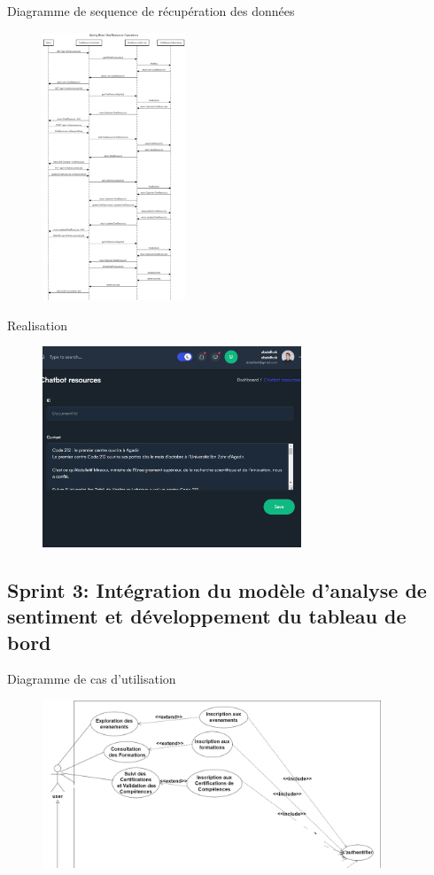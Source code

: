 \begin{frame}{Diagramme de sequence de récupération des données}
    \begin{figure}[H]
        \centering
        \includegraphics[height=8cm]{assets/images/chat-res-seq.png}
    \end{figure}
\end{frame}

\begin{frame}{Realisation}
    \begin{figure}[H]
        \centering
        \includegraphics[height=6cm]{assets/images/admin-doc.png}
    \end{figure}
\end{frame}



\subsection{Sprint 3: Intégration du modèle d'analyse de sentiment et développement du tableau de bord}
\begin{frame}{Diagramme de cas d'utilisation}

    \begin{figure}[H]
        \centering
        \includegraphics[height=5cm]{assets/images/sprint3-usecase.png}
    \end{figure}
\end{frame}

